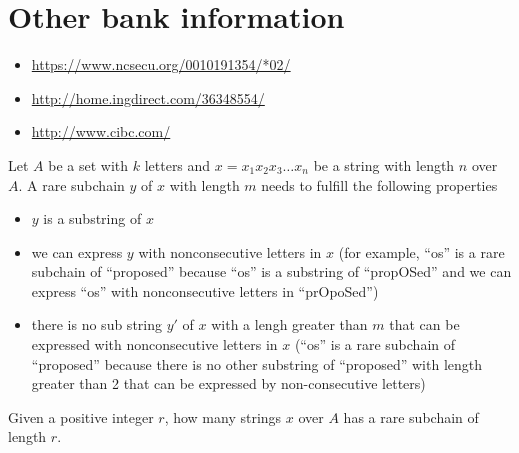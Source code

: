 \documentclass[11pt]{article}
\begin{document}
\section{Other bank information}
\begin{itemize}
\item \url{https://www.ncsecu.org/0010191354/*02/}
\item \url{http://home.ingdirect.com/36348554/}
\item \url{http://www.cibc.com/}
\end{itemize}

\clearpage

Let $A$ be a set with $k$ letters and 
$x = x_1x_2x_3…x_n$ be a string with length $n$ over $A$. 
A rare subchain $y$ of $x$ with length $m$ needs to fulfill the following properties
\begin{itemize}
\item $y$ is a substring of $x$
\item we can express $y$ with nonconsecutive letters in $x$ (for example,  ``os'' 
is a rare subchain of ``proposed'' because ``os'' is a substring of ``propOSed'' and we can express ``os'' 
with nonconsecutive letters in ``prOpoSed'')
\item there is no sub string $y'$ of $x$ with a lengh greater than $m$ that can be expressed with nonconsecutive letters in $x$ (``os'' is a rare subchain of ``proposed'' because there is no other substring of ``proposed'' with length greater than 2 that can be expressed by non-consecutive letters)
\end{itemize}
Given a positive integer $r$,  how many strings $x$ over $A$  has a rare subchain of length $r$.
\end{document}

